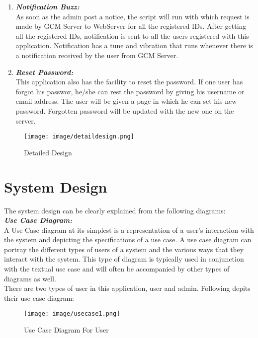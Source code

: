 \begin{enumerate}
\item \textbf{\emph{Notification Buzz:}}\\
As soon as the admin post a notice, the script will run with which request is made by GCM Server to WebServer for all the registered IDs.
After getting all the registered IDs, notification is sent to all the users registered with this application.
Notification has a tune and vibration that runs whenever there is a notification received by the user from GCM Server.

\item \textbf{\emph{Reset Password:}}\\
This application also has the facility to reset the password. If one user has forgot his passwor, he/she can rest the password by giving
his username or email address. The user will be given a page in which he can set his new password. Forgotten password will be updated with the new one on the server.

\end{enumerate}

\begin{figure}[H]
\centering \texttt{[image: image/detaildesign.png]}
\caption{Detailed Design}
\end{figure}
\pagebreak

\section{System Design}
The system design can be clearly explained from the following diagrams:\\
\textbf{\emph{Use Case Diagram:}}\\

A Use Case diagram at its simplest is a representation of a user's interaction with the system and depicting the specifications of a use case. A use case diagram can portray the different types of users of a system and the various ways that they interact with the system. This type of diagram is typically used in conjunction with the textual use case and will often be accompanied by other types of diagrams as well.
\\
There are two types of user in this application, user and admin. Following depits their use case diagram:

\begin{figure}[H]
\centering \texttt{[image: image/usecase1.png]}
\caption{Use Case Diagram For User}
\end{figure}

